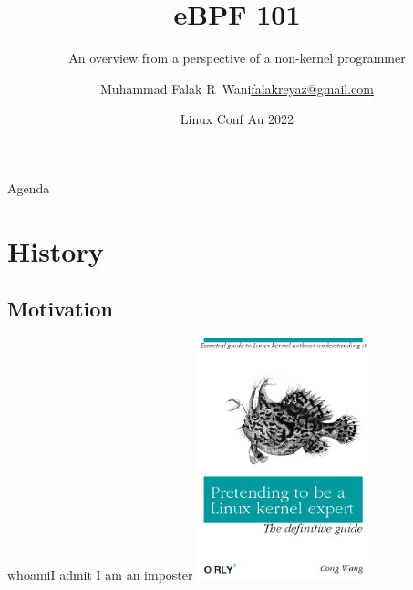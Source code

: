 \documentclass{beamer}
\title{eBPF 101}
\subtitle{An overview from a perspective of a non-kernel programmer}
\author[@vimfrw]{\texorpdfstring{Muhammad Falak R~Wani\newline\url{falakreyaz@gmail.com}}{Author}}
\date[LCA 22]{Linux Conf Au 2022}
\begin{document}
\begin{frame}
	\titlepage
\end{frame}

\begin{frame}{Agenda}
	\tableofcontents
	
\end{frame}

\section{History}

\subsection{Motivation}

\begin{frame}{whoami}{I admit I am an imposter}
    \centering
    \includegraphics[height=7cm]{imposter.png}
\end{frame}
\end{document}
